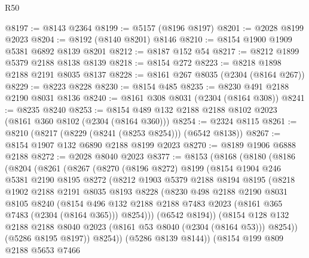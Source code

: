 \begin{lexlean}{R50}
\begin{coremodule}
@8197 := @8143 @2364
@8199 := @5157 (@8196 @8197)
@8201 := @2028 @8199 @2023
@8204 := @8192 (@8140 @8201) @8146
@8210 := @8154 @1900 @1909 @5381 @6892 @8139 @8201
@8212 := @8187 @152 @54
@8217 := @8212 @1899 @5379 @2188 @8138 @8139
@8218 := @8154 @272
@8223 := @8218 @1898 @2188 @2191 @8035 @8137
@8228 := @8161 @267 @8035 (@2304 (@8164 @267))
@8229 := @8223 @8228
@8230 := @8154 @485
@8235 := @8230 @491 @2188 @2190 @8031 @8136
@8240 := @8161 @308 @8031 (@2304 (@8164 @308))
@8241 := @8235 @8240
@8253 := @8154 @489 @132 @2188 @2188 @8102 @2023 (@8161 @360 @8102 (@2304 (@8164 @360)))
@8254 := @2324 @8115
@8261 := @8210 (@8217 (@8229 (@8241 (@8253 @8254))) (@6542 @8138))
@8267 := @8154 @1907 @132 @6890 @2188 @8199 @2023
@8270 := @8189 @1906 @6888 @2188
@8272 := @2028 @8040 @2023
@8377 := @8153
    (@8168
      (@8180
        (@8186
          (@8204
            (@8261
              (@8267
                (@8270
                  (@8196 @8272)
                  @8199
                  (@8154
                    @1904
                    @246
                    @5381
                    @2190
                    @8195
                    @8272
                    (@8212
                      @1903
                      @5379
                      @2188
                      @8194
                      @8195
                      (@8218
                        @1902
                        @2188
                        @2191
                        @8035
                        @8193
                        @8228
                        (@8230
                          @498
                          @2188
                          @2190
                          @8031
                          @8105
                          @8240
                          (@8154
                            @496
                            @132
                            @2188
                            @2188
                            @7483
                            @2023
                            (@8161 @365 @7483 (@2304 (@8164 @365)))
                            @8254)))
                      (@6542 @8194))
                    (@8154
                      @128
                      @132
                      @2188
                      @2188
                      @8040
                      @2023
                      (@8161 @53 @8040 (@2304 (@8164 @53)))
                      @8254))
                  (@5286 @8195 @8197))
                @8254))
            (@5286 @8139 @8144))
          (@8154
            @199
            @809
            @2188
            @5653
            @7466

\end{coremodule}
\end{lexlean}
